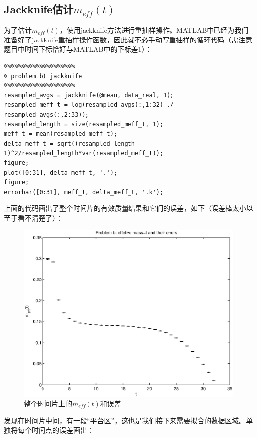 \documentclass[paper=a4, fontsize=11pt]{scrartcl} %
\numberwithin{equation}{section} %
\numberwithin{figure}{section} %
\numberwithin{table}{section} %
\begin{document}
\begin{CJK*}{UTF8}{gbsn}
\subsection{Jackknife估计$m_{eff}(t)$}
为了估计$m_{eff}(t)$，使用jackknife方法进行重抽样操作。MATLAB中已经为我们准备好了jackknife重抽样操作函数，因此就不必手动写重抽样的循环代码（需注意题目中时间下标恰好与MATLAB中的下标差1）：
\lstset{language=MATLAB}
\begin{lstlisting}
%%%%%%%%%%%%%%%%%%%%
% problem b) jackknife
%%%%%%%%%%%%%%%%%%%%
resampled_avgs = jackknife(@mean, data_real, 1);
resampled_meff_t = log(resampled_avgs(:,1:32) ./ resampled_avgs(:,2:33));
resampled_length = size(resampled_meff_t, 1);
meff_t = mean(resampled_meff_t);
delta_meff_t = sqrt((resampled_length-1)^2/resampled_length*var(resampled_meff_t));
figure;
plot([0:31], delta_meff_t, '.');
figure;
errorbar([0:31], meff_t, delta_meff_t, '.k');
\end{lstlisting}
上面的代码画出了整个时间片的有效质量结果和它们的误差，如下（误差棒太小以至于看不清楚了）：
\begin{figure}[H]
\centering
\includegraphics[width=150mm]{problem3_b_1.eps}
\caption{整个时间片上的$m_{eff}(t)$和误差}
\end{figure}
发现在时间片中间，有一段“平台区”，这也是我们接下来需要拟合的数据区域。单独将每个时间点的误差画出：
\begin{figure}[H]
\centering

\end{figure}
\end{CJK*}
\end{document}
